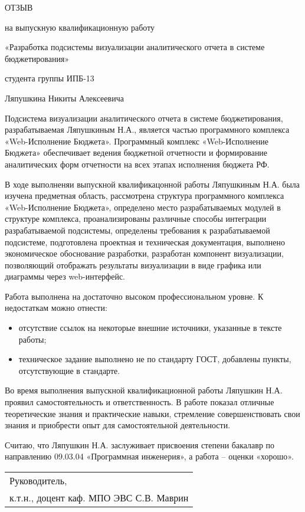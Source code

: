 \documentclass[a4paper]{extarticle}
\begin{document}
{
\centering
\large ОТЗЫВ\par
\large на выпускную квалификационную работу\par
\large «Разработка подсистемы визуализации аналитического отчета в системе бюджетирования»\par
\large студента группы ИПБ-13\par
\large Ляпушкина Никиты Алексеевича\par\vspace{1cm}
}

Подсистема визуализации аналитического отчета в системе бюджетирования, разрабатываемая Ляпушкиным Н.А., является частью программного комплекса «Web-Исполнение Бюджета». Программный комплекс «Web-Исполнение Бюджета» обеспечивает ведения бюджетной отчетности и формирование аналитических форм отчетности на всех этапах исполнения бюджета РФ.\par
В ходе выполненяи выпускной квалификацонной работы Ляпушкиным Н.А. была изучена предметная область, рассмотрена структура программного комплекса «Web-Исполнение Бюджета», определено место разрабатываемых модулей в структуре комплекса, проанализированы различные способы интеграции разрабатываемой подсистемы, определены требования к разрабатываемой подсистеме, подготовлена проектная и техническая документация, выполнено экономическое обоснование разработки, разработан компонент визуализации, позволяющий отображать результаты визуализации в виде графика или диаграммы через web-интерфейс.\par
Работа выполнена на достаточно высоком профессиональном уровне.
К недостаткам можно отнести:
\begin{itemize}
\item отсутствие ссылок на некоторые внешние источники, указанные в тексте работы;
\item техническое задание выполнено не по стандарту ГОСТ, добавлены пункты, отсутствующие в стандарте.
\end{itemize}\par
Во время выполнения выпускной квалификационной работы Ляпушкин Н.А. проявил самостоятельность и ответственность. В работе показал отличные теоретические знания и практические навыки, стремление совершенствовать свои знания и приобрести опыт для самостоятельной деятельности.\par
Считаю, что Ляпушкин Н.А. заслуживает присвоения степени бакалавр по направлению 09.03.04 «Программная инженерия», а работа – оценки «хорошо».\par
\vspace{1cm}
\begin{flushright}
\begin{tabular}{p{}}
  Руководитель, \hfill \\
  к.т.н., доцент каф. МПО ЭВС \hrulefill С.В. Маврин 
\end{tabular}
\end{flushright}
\end{document}
